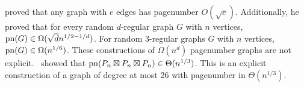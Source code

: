 \textcite{malitzGraphsEdgesHave1994} proved that any graph with $e$ edges has pagenumber $O(\sqrt{e})$. Additionally, he proved that for every random $d$-regular graph $G$ with $n$ vertices, $\operatorname{pn}(G) \in \Omega(\sqrt{d} n^{1/2 - 1/d})$. For random 3-regular graphs $G$ with $n$ vertices, $\operatorname{pn}(G) \in \Omega(n^{1/6})$. These constructions of $\Omega(n^d)$ pagenumber graphs are not explicit.\ \textcite{eppsteinThreeDimensionalGraphProducts2024} showed that $\operatorname{pn}(P_n \boxtimes P_n \boxtimes P_n) \in \Theta(n^{1/3})$. This is an explicit construction of a graph of degree at most 26 with pagenumber in $\Theta(n^{1/3})$. 